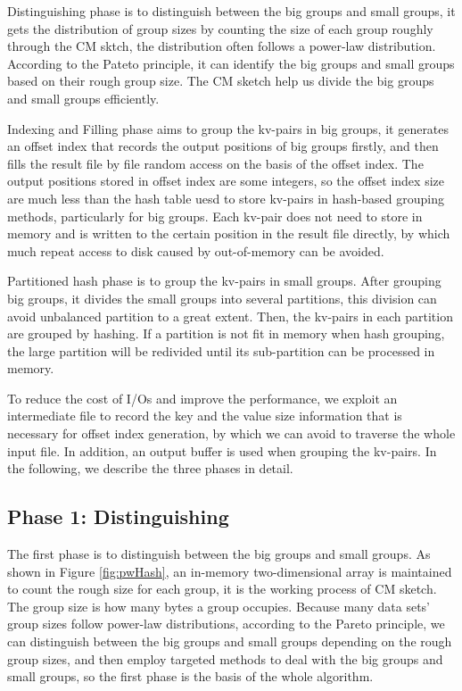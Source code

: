 Distinguishing phase is to distinguish between the big groups and small groups, it gets the distribution of group sizes by counting the size of each group roughly through the CM sktch, the distribution often follows a power-law distribution. According to the Pateto principle, it can identify the big groups and small groups based on their rough group size. The CM sketch help us divide the big groups and small groups efficiently.

Indexing and Filling phase aims to group the kv-pairs in big groups, it generates an offset index that records the output positions of big groups firstly, and then fills the result file by file random access on the basis of the offset index. The output positions stored in offset index are some integers, so the offset index size are much less than the hash table uesd to store kv-pairs in hash-based grouping methods, particularly for big groups. Each kv-pair does not need to store in memory and is written to the certain position in the result file directly, by which much repeat access to disk caused by out-of-memory can be avoided.

Partitioned hash phase is to group the kv-pairs in small groups. After grouping big groups, it divides the small groups into several partitions, this division can avoid unbalanced partition to a great extent. Then, the kv-pairs in each partition are grouped by hashing. If a partition is not fit in memory when hash grouping, the large partition will be redivided until its sub-partition can be processed in memory.

To reduce the cost of I/Os and improve the performance, we exploit an intermediate file to record the key and the value size information that is necessary for offset index generation, by which we can avoid to traverse the whole input file. In addition, an output buffer is used when grouping the kv-pairs. In the following, we describe the three phases in detail.

\subsection{Phase 1: Distinguishing}%

The first phase is to distinguish between the big groups and small groups. As shown in Figure \ref{fig:pwHash}, an in-memory two-dimensional array is maintained to count the rough size for each group, it is the working process of CM sketch. The group size is how many bytes a group occupies. Because many data sets' group sizes follow power-law distributions, according to the Pareto principle, we can distinguish between the big groups and small groups depending on the rough group sizes, and then employ targeted methods to deal with the big groups and small groups, so the first phase is the basis of the whole algorithm. 

